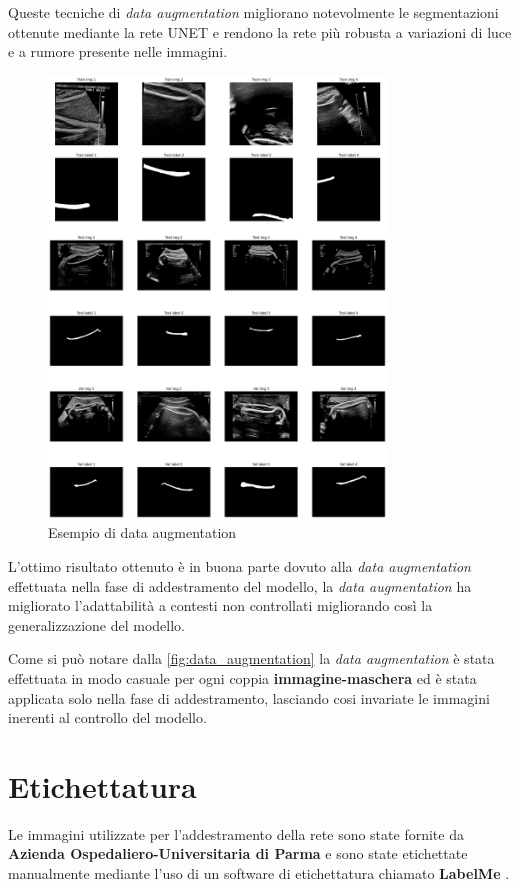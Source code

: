Queste tecniche di \textit{data augmentation} migliorano notevolmente le
segmentazioni ottenute mediante la rete UNET e rendono la rete più robusta a
variazioni di luce e a rumore presente nelle immagini.


\begin{figure}
    \centering
    \includegraphics[width=0.8\textwidth]{Immagini/data_augmentation.png}
    \caption{Esempio di data augmentation}
    \label{fig:data_augmentation}
\end{figure}

L'ottimo risultato ottenuto è in buona parte dovuto alla \textit{data
augmentation} effettuata nella fase di addestramento del modello, la
\textit{data augmentation} ha migliorato l'adattabilità a contesti non
controllati migliorando così la generalizzazione del modello.

Come si può notare dalla \autoref{fig:data_augmentation} la \textit{data
augmentation} è stata effettuata in modo casuale per ogni coppia
\textbf{immagine-maschera} ed è stata applicata solo nella fase di
addestramento, lasciando cosi invariate le immagini inerenti al controllo del
modello.

\section{Etichettatura} Le immagini utilizzate per l'addestramento della rete
sono state fornite da \textbf{Azienda Ospedaliero-Universitaria di Parma} e sono
state etichettate manualmente mediante l'uso di un software di etichettatura
chiamato \textbf{LabelMe} \cite{labelme}.

